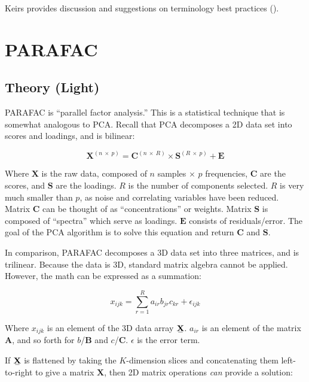 \documentclass[10pt,twocolumn,twoside,]{pinp}
\begin{document}
Keirs provides discussion and suggestions on terminology best practices
(\cite{Kiers2000}).

\hypertarget{parafac}{%
\section{PARAFAC}\label{parafac}}

\hypertarget{theory-light}{%
\subsection{Theory (Light)}\label{theory-light}}

PARAFAC is ``parallel factor analysis.'' This is a statistical technique
that is somewhat analogous to PCA. Recall that PCA decomposes a 2D data
set into scores and loadings, and is bilinear:

\[
\mathbf{X}^{(n \ \times \ p)} = \mathbf{C}^{(n \ \times \ R)} \times \mathbf{S}^{(R \ \times \ p)} + \mathbf{E}
\]

Where \(\mathbf{X}\) is the raw data, composed of \(n\) samples
\(\times\) \(p\) frequencies, \(\mathbf{C}\) are the scores, and
\(\mathbf{S}\) are the loadings. \(R\) is the number of components
selected. \(R\) is very much smaller than \(p\), as noise and
correlating variables have been reduced. Matrix \(\mathbf{C}\) can be
thought of as ``concentrations'' or weights. Matrix \(\mathbf{S}\) is
composed of ``spectra'' which serve as loadings. \(\mathbf{E}\) consists
of residuals/error. The goal of the PCA algorithm is to solve this
equation and return \(\mathbf{C}\) and \(\mathbf{S}\).

In comparison, PARAFAC decomposes a 3D data set into three matrices, and
is trilinear. Because the data is 3D, standard matrix algebra cannot be
applied. However, the math can be expressed as a summation:

\[
x_{ijk} = \sum_{r = 1}^{R} a_{ir}b_{jr}c_{kr} + \epsilon_{ijk}
\]

Where \(x_{ijk}\) is an element of the 3D data array
\(\stackunder[1.2pt]{$\mathbf{X}$}{\rule{1.2ex}{.075ex}}\). \(a_{ir}\)
is an element of the matrix \(\mathbf{A}\), and so forth for
\(b\)/\(\mathbf{B}\) and \(c\)/\(\mathbf{C}\). \(\epsilon\) is the error
term.

If \(\stackunder[1.2pt]{$\mathbf{X}$}{\rule{1.2ex}{.075ex}}\) is
flattened by taking the \(K\)-dimension slices and concatenating them
left-to-right to give a matrix \(\mathbf{X}\), then 2D matrix operations
\emph{can} provide a solution:
\end{document}
